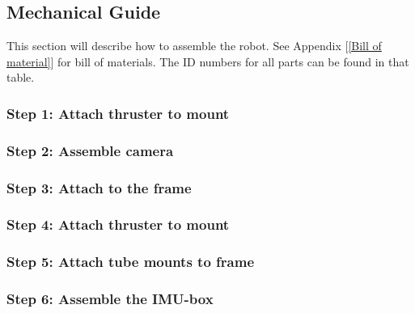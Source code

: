 \subsection{Mechanical Guide}

This section will describe how to assemble the robot. See Appendix [\ref{Bill of material}] for bill of materials. The ID numbers for all parts can be found in that table.



\subsubsection{Step 1: Attach thruster to mount}





\subsubsection{Step 2: Assemble camera}




\subsubsection{Step 3: Attach to the frame}




\subsubsection{Step 4: Attach thruster to mount}




\subsubsection{Step 5: Attach tube mounts to frame}




\subsubsection{Step 6: Assemble the IMU-box}



